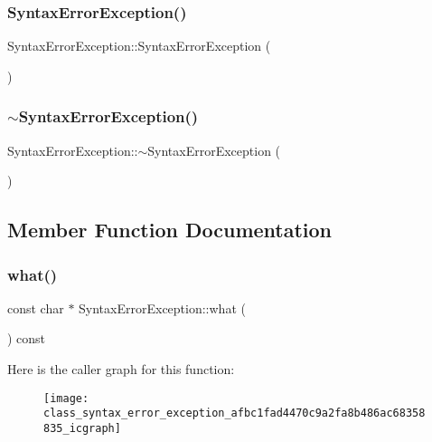 \subsubsection{\texorpdfstring{SyntaxErrorException()}{SyntaxErrorException()}}
{\footnotesize\ttfamily Syntax\+Error\+Exception\+::\+Syntax\+Error\+Exception (\begin{DoxyParamCaption}{ }\end{DoxyParamCaption})}

\mbox{\label{class_syntax_error_exception_a367745682a61a7fea37fab27e0f24cbe}} 
\subsubsection{\texorpdfstring{$\sim$SyntaxErrorException()}{~SyntaxErrorException()}}
{\footnotesize\ttfamily Syntax\+Error\+Exception\+::$\sim$\+Syntax\+Error\+Exception (\begin{DoxyParamCaption}{ }\end{DoxyParamCaption})}



\subsection{Member Function Documentation}
\mbox{\label{class_syntax_error_exception_afbc1fad4470c9a2fa8b486ac68358835}} 
\subsubsection{\texorpdfstring{what()}{what()}}
{\footnotesize\ttfamily const char $\ast$ Syntax\+Error\+Exception\+::what (\begin{DoxyParamCaption}{ }\end{DoxyParamCaption}) const\hspace{0.3cm}{\ttfamily [noexcept]}}

Here is the caller graph for this function\+:
\nopagebreak
\begin{figure}[H]
\begin{center}
\leavevmode
\texttt{[image: class\_syntax\_error\_exception\_afbc1fad4470c9a2fa8b486ac68358835\_icgraph]}
\end{center}
\end{figure}


